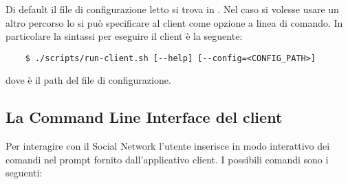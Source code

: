 \documentclass[
    oneside,
    10pt,
    language=italian,
    a4paper,
    article
]{notes}
\begin{document}
Di default il file di configurazione letto si trova in 
. Nel caso si volesse usare un altro percorso
lo si può specificare al client come opzione a linea di comando. 
In particolare la sintassi per eseguire il client è la seguente: 

\begin{verbatim}
    $ ./scripts/run-client.sh [--help] [--config=<CONFIG_PATH>]
\end{verbatim}

dove  è il path del file di configurazione. 

\subsection{La Command Line Interface del client}
Per interagire con il Social Network l'utente inserisce in modo interattivo
dei comandi nel prompt fornito dall'applicativo client. I possibili comandi sono
i seguenti:
\end{document}
